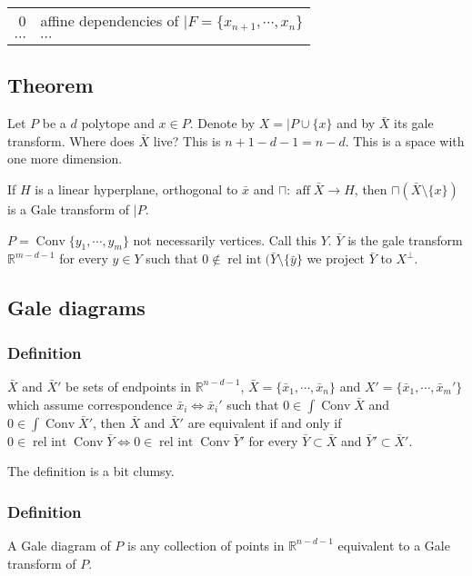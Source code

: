 \documentclass[11pt]{article}
\def\R{\mathbb{R}}
\def\aff{\operatorname{aff}}
\def\relint{\operatorname{rel\ int}}
\def\conv{\operatorname{Conv}}
\begin{document}
{{{\begin{center}
\begin{tabular}{rl}
0 & affine dependencies of \(\vert F = \{x_{n+1}, \cdots, x_n\}\)\\
\(\cdots\) & \(\cdots\)\\
\end{tabular}
\end{center}
\subsection{Theorem}
\label{sec:org1b0a296}
Let \(P\) be a \(d\) polytope and \(x\in P\). Denote by \(X = \vert P \cup \{x\}\)
and by \(\bar{X}\) its gale transform. Where does \(\bar{X}\) live? This is \(n +
   1 - d - 1 = n - d\). This is a space with one more dimension.

If \(H\) is a linear hyperplane, orthogonal to \(\bar{x}\) and \(\sqcap \colon
   \aff \bar{X} \rightarrow H\), then \(\sqcap (\bar{X}\setminus \{x\})\) is a Gale
transform of \(\vert P\).

\(P = \conv \{y_1, \cdots, y_m\}\) not necessarily vertices. Call this \(Y\).
\(\bar{Y}\) is the gale transform \(\R^{m-d-1}\) for every \(y \in Y\) such that \(0
   \notin \relint (\bar{Y} \setminus \{\bar{y}\}\) we project \(\bar{Y}\) to
\(X^\perp\).
\subsection{Gale diagrams}
\label{sec:org9a6366c}
\subsubsection{Definition}
\label{sec:org662adde}
\(\bar{X}\) and \(\bar{X}'\) be sets of endpoints in \(\R^{n-d-1}\), \(\bar{X} =
    \{\bar{x}_1, \cdots, \bar{x}_n\}\) and \(X' = \{\bar{x}_1, \cdots,
    \bar{x}_m'\}\) which assume correspondence \(\bar{x}_i \iff \bar{x}_i'\) such
that \(0 \in \int \conv \bar{X}\) and \(0 \in \int \conv \bar{X}'\), then
\(\bar{X}\) and \(\bar{X}'\) are equivalent if and only if \(0 \in \relint \conv
    \bar{Y}\iff 0 \in \relint \conv \bar{Y}'\) for every \(\bar{Y} \subset
    \bar{X}\) and \(\bar{Y}' \subset \bar{X}'\).

The definition is a bit clumsy.
\subsubsection{Definition}
\label{sec:org2b91d0b}
A Gale diagram of \(P\) is any collection of points in \(\R^{n-d-1}\) equivalent
to a Gale transform of \(P\).
}}}
\end{document}
